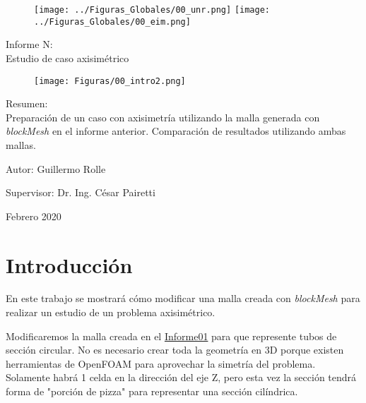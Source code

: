 \documentclass{article}
\begin{document}
\begin{titlepage}
  \begin{figure}[t]
    \centering
    \texttt{[image: ../Figuras\_Globales/00\_unr.png]}
    \hspace{0.15\textwidth}
    \texttt{[image: ../Figuras\_Globales/00\_eim.png]}
\end{figure}
  
\begin{center}
    {\Huge Informe N:\\ Estudio de caso axisimétrico \par}
    
    
    \begin{figure}[h]
        \centering
        \texttt{[image: Figuras/00\_intro2.png]}
    \end{figure}
    {\Huge Resumen:\\}
   Preparación de un caso con axisimetría utilizando la malla generada con \textit{blockMesh} en el informe anterior. Comparación de resultados utilizando ambas mallas.
    
    \bigskip
    \vspace*{\fill}
    Autor: Guillermo Rolle\par
    Supervisor: Dr. Ing. César Pairetti\par
    \bigskip
    Febrero 2020
\end{center}
\end{titlepage}

\tableofcontents
\newpage

\section{Introducción}
En este trabajo se mostrará cómo modificar una malla creada con \textit{blockMesh} para realizar un estudio de un problema axisimétrico.\par
Modificaremos la malla creada en el \href{https://github.com/guillerolle/informes_cfd/blob/master/Informe01.pdf}{Informe01} para que represente tubos de sección circular. No es necesario crear toda la geometría en 3D porque existen herramientas de OpenFOAM para aprovechar la simetría del problema. Solamente habrá 1 celda en la dirección del eje Z, pero esta vez la sección tendrá forma de "porción de pizza" para representar una sección cilíndrica.
\end{document}
